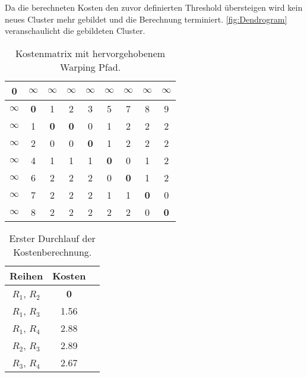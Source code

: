 Da die berechneten Kosten den zuvor definierten Threshold übersteigen wird kein neues Cluster mehr gebildet
und die Berechnung terminiert.
\autoref{fig:Dendrogram} veranschaulicht die gebildeten Cluster.
\begin{table}[ht]
    \begin{center}
        \begin{tabular}{ |c||c|c|c|c|c|c|c|c| } 
         \hline
         \textbf{0} & $\infty$ & $\infty$ & $\infty$
         & $\infty$ & $\infty$ & $\infty$ & $\infty$ & $\infty$ \\
         \hline
         \hline
         $\infty$ &\textbf{0} & 1 & 2 & 3 & 5 & 7 & 8 & 9 \\
         \hline
         $\infty$ & 1 & \textbf{0} & \textbf{0} & 0 & 1 & 2 & 2 & 2 \\
         \hline
         $\infty$ & 2 & 0 & 0 & \textbf{0} & 1 & 2 & 2 & 2 \\
         \hline
         $\infty$ & 4 & 1 & 1 & 1 & \textbf{0} & 0 & 1 & 2 \\
         \hline
         $\infty$ & 6 & 2 & 2 & 2 & 0 & \textbf{0} & 1 & 2 \\
         \hline
         $\infty$ & 7 & 2 & 2 & 2 & 1 & 1 & \textbf{0} & 0 \\
         \hline
         $\infty$ & 8 & 2 & 2 & 2 & 2 & 2 & 0 & \textbf{0} \\
         \hline
        \end{tabular}
        \caption{Kostenmatrix mit hervorgehobenem Warping Pfad.}
        \label{tbl:ExampleMatrix}
    \end{center}
\end{table}
\begin{table}[ht]
    \begin{center}
        \begin{tabular}{ |c|c|c| } 
         \hline
         Reihen & Kosten \\
         \hline \hline
         $R_{1}$, $R_{2}$ & \textbf{0} \\
         \hline
         $R_{1}$, $R_{3}$ & 1.56 \\
         \hline
         $R_{1}$, $R_{4}$ & 2.88 \\
         \hline
         $R_{2}$, $R_{3}$ & 2.89 \\
         \hline
         $R_{3}$, $R_{4}$ & 2.67 \\
         \hline
        \end{tabular}
        \caption{Erster Durchlauf der Kostenberechnung.}
        \label{tbl:ExampleCost1}
    \end{center}
\end{table}
